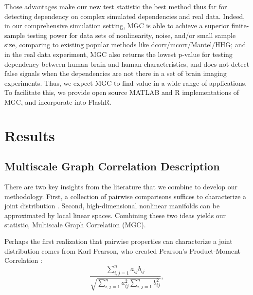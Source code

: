 \documentclass[11pt]{article}
\begin{document}
Those advantages make our new test statistic the best method thus far for detecting dependency on complex simulated dependencies and real data. Indeed, in our comprehensive simulation setting, MGC is able to achieve a superior finite-sample testing power for data sets of nonlinearity, noise, and/or small sample size, comparing to existing popular methods like dcorr/mcorr/Mantel/HHG; and in the real data experiment, MGC also returns the lowest p-value for testing dependency between human brain and human characteristics,  and does not detect false signals when the dependencies are not there in a set of brain imaging experiments. Thus, we expect MGC to find value in a wide range of applications.  To facilitate this, we provide open source MATLAB and R implementations of MGC, and incorporate into FlashR.

\section{Results}
\label{main}
\subsection{Multiscale Graph Correlation Description}
\label{main1}
There are two key insights from the literature that we combine to develop our methodology.  First, a collection of pairwise comparisons  suffices to characterize a joint distribution \cite{Maa1996}.  Second, high-dimensional nonlinear manifolds can be approximated by local linear spaces.  Combining these two ideas yields our statistic,  Multiscale Graph Correlation (MGC).  

Perhaps the first realization that pairwise properties can characterize a joint distribution comes from  Karl Pearson, who created Pearson's Product-Moment Correlation \cite{Pearson1895}:
\begin{equation}
\label{generalCoef}
\frac{\sum_{i,j=1}^n a_{ij} b_{ij}}{\sqrt{\sum_{i,j=1}^n  a_{ij}^{2} \sum_{i,j=1}^n b_{ij}^{2}}}, 
\end{equation}
\end{document}
